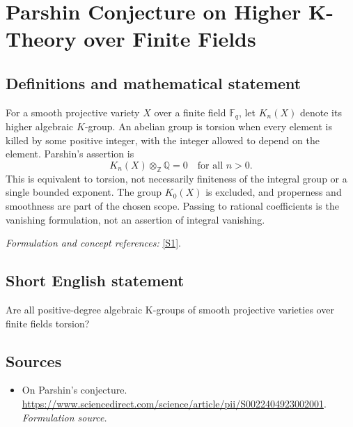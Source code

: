 \documentclass[11pt]{article}
\begin{document}
\section*{\texorpdfstring{Parshin Conjecture on Higher K-Theory over Finite Fields}{Parshin Conjecture on Higher K-Theory over Finite Fields}}\label{222}
\subsection{Definitions and mathematical statement}
For a smooth projective variety $X$ over a finite field ${\mathbb{F}}_q$, let $K_n(X)$ denote its higher algebraic $K$-group. An abelian group is torsion when every element is killed by some positive integer, with the integer allowed to depend on the element. Parshin's assertion is
\[
 K_n(X)\otimes_{{\mathbb{Z}}}{\mathbb{Q}}=0\quad\text{for all }n>0.
\]
This is equivalent to torsion, not necessarily finiteness of the integral group or a single bounded exponent. The group $K_0(X)$ is excluded, and properness and smoothness are part of the chosen scope. Passing to rational coefficients is the vanishing formulation, not an assertion of integral vanishing.
\par\smallskip\textit{Formulation and concept references:} \href{https://www.sciencedirect.com/science/article/pii/S0022404923002001}{[S1]}.

\subsection{Short English statement}
Are all positive-degree algebraic K-groups of smooth projective varieties over finite fields torsion?
\subsection{Sources}
\begin{itemize}
\item[S1]On Parshin's conjecture.
\url{https://www.sciencedirect.com/science/article/pii/S0022404923002001}.
\textit{Formulation source.}
\end{itemize}
\end{document}
